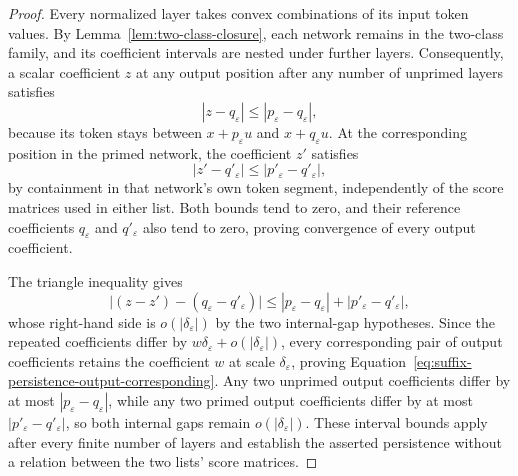\documentclass[mlmain]{jmlr}
\begin{document}
\begin{proof}
Every normalized layer takes convex combinations of its input token
values.  By Lemma~\ref{lem:two-class-closure}, each network remains in the
two-class family, and its coefficient intervals are nested under further
layers.  Consequently, a scalar coefficient $z$ at any output position
after any number of unprimed layers satisfies
\begin{equation}
 |z-q_\varepsilon|\le|p_\varepsilon-q_\varepsilon|,
 \label{eq:quantitative-suffix-bounds}
\end{equation}
because its token stays between $x+p_\varepsilon u$ and
$x+q_\varepsilon u$.  At the corresponding position in the primed
network, the coefficient $z'$ satisfies
\begin{equation}
 |z'-q'_\varepsilon|\le|p'_\varepsilon-q'_\varepsilon|,
 \label{eq:quantitative-suffix-primed-bound}
\end{equation}
by containment in that network's own token segment, independently of the
score matrices used in either list.  Both bounds tend to zero, and their
reference coefficients $q_\varepsilon$ and $q'_\varepsilon$ also tend to
zero, proving convergence of every output coefficient.

The triangle inequality gives
\begin{equation}
 \bigl|(z-z')-(q_\varepsilon-q'_\varepsilon)\bigr|
 \le |p_\varepsilon-q_\varepsilon|
     +|p'_\varepsilon-q'_\varepsilon|,
 \label{eq:suffix-persistence-corresponding-proof}
\end{equation}
whose right-hand side is $o(|\delta_\varepsilon|)$ by the two internal-gap
hypotheses.  Since the repeated coefficients differ by
$w\delta_\varepsilon+o(|\delta_\varepsilon|)$, every corresponding pair
of output coefficients retains the coefficient $w$ at scale
$\delta_\varepsilon$, proving
Equation~\eqref{eq:suffix-persistence-output-corresponding}.  Any two
unprimed output coefficients differ by at most
$|p_\varepsilon-q_\varepsilon|$, while any two primed output coefficients
differ by at most $|p'_\varepsilon-q'_\varepsilon|$, so both internal gaps
remain $o(|\delta_\varepsilon|)$.  These interval bounds apply after
every finite number of layers and establish the asserted persistence
without a relation between the two lists' score matrices.
\end{proof}
\end{document}

